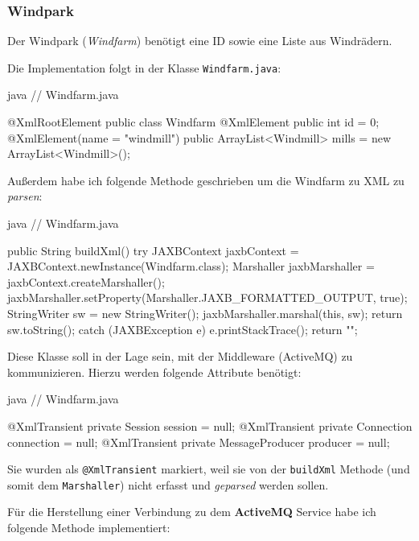 \subsubsection{Windpark}
\label{sec:windfarm}

Der Windpark (\textit{Windfarm}) benötigt eine ID sowie eine Liste aus Windrädern.

Die Implementation folgt in der Klasse \texttt{Windfarm.java}:

\begin{code}{java}
// Windfarm.java

@XmlRootElement
public class Windfarm {
    @XmlElement
    public int id = 0;
    @XmlElement(name = "windmill")
    public ArrayList<Windmill> mills = new ArrayList<Windmill>();
}
\end{code}

Außerdem habe ich folgende Methode geschrieben um die Windfarm zu XML zu \textit{parsen}:

\begin{code}{java}
    // Windfarm.java

    public String buildXml() {
        try {
            JAXBContext jaxbContext = JAXBContext.newInstance(Windfarm.class);
            Marshaller jaxbMarshaller = jaxbContext.createMarshaller();
            jaxbMarshaller.setProperty(Marshaller.JAXB_FORMATTED_OUTPUT, true);
            StringWriter sw = new StringWriter();
            jaxbMarshaller.marshal(this, sw);
            return sw.toString();
        } catch (JAXBException e) {
            e.printStackTrace();
            return "";
        }
    }
\end{code}

Diese Klasse soll in der Lage sein, mit der Middleware (ActiveMQ) zu kommunizieren. Hierzu werden folgende Attribute benötigt:

\begin{code}{java}
// Windfarm.java

@XmlTransient
private Session session = null;
@XmlTransient
private Connection connection = null;
@XmlTransient
private MessageProducer producer = null;
\end{code}

Sie wurden als \texttt{@XmlTransient} markiert, weil sie von der \texttt{buildXml} Methode (und somit dem \texttt{Marshaller}) nicht erfasst und \textit{geparsed} werden sollen.

Für die Herstellung einer Verbindung zu dem \textbf{ActiveMQ} Service habe ich folgende Methode implementiert:

